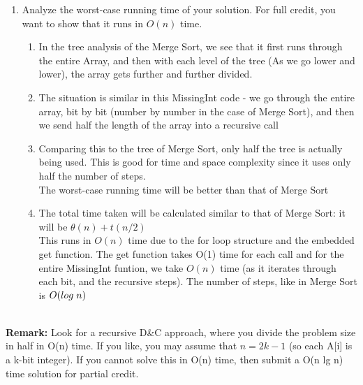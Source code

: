 \documentclass[11pt]{article}
\begin{document}
\begin{enumerate}
\begin{enumerate}
        \item Analyze the worst-case running time of your solution. For full credit, you want to show that it runs in $O(n)$ time.
        \begin{enumerate}
                \item In the tree analysis of the Merge Sort, we see that it first runs through the entire Array, and then with each level of the tree (As we go lower and lower), the array gets further and further divided. 
                \item The situation is similar in this MissingInt code - we go through the entire array, bit by bit (number by number in the case of Merge Sort), and then we send half the length of the array into a recursive call
                \item Comparing this to the tree of Merge Sort, only half the tree is actually being used. This is good for time and space complexity since it uses only half the number of steps. \\
                The worst-case running time will be better than that of Merge Sort
                \item The total time taken will be calculated similar to that of Merge Sort: it will be $\theta (n) + t(n/2)$\\
                This runs in $O(n)$ time due to the for loop structure and the embedded get function. The get function takes O(1) time for each call and for the entire MissingInt funtion, we take $O(n)$ time (as it iterates through each bit, and the recursive steps). The number of steps, like in Merge Sort is $O(log \hspace{0.1cm}n)$
            \end{enumerate}
    \end{enumerate}
        

        \\
        \textbf{Remark: }Look for a recursive D&C approach, where you divide the problem size in half in O(n) time. If you like, you may assume that $n = 2k-1$ (so each A[i] is a k-bit integer). If you cannot solve this in O(n) time, then submit a O(n lg n) time solution for partial credit.


\end{enumerate}
\end{document}
